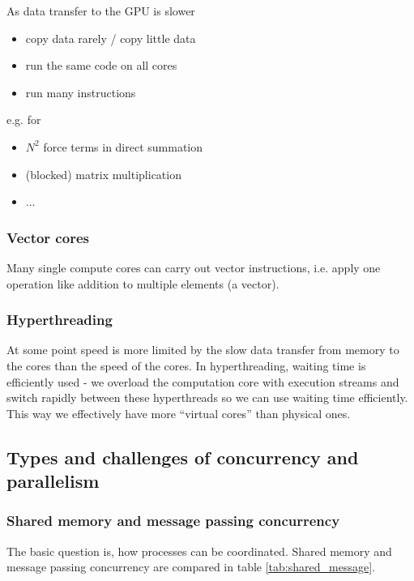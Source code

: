 As data transfer to the GPU is slower
\begin{itemize}
    \item copy data rarely / copy little data
    \item run the same code on all cores
    \item run many instructions
\end{itemize}
e.g. for
\begin{itemize}
    \item $N^2$ force terms in direct summation
    \item (blocked) matrix multiplication
    \item ...
\end{itemize}

\subsubsection{Vector cores}
Many single compute cores can carry out vector instructions, i.e. apply one operation
like addition to multiple elements (a vector).

\subsubsection{Hyperthreading}
At some point speed is more limited by the slow data transfer from memory 
to the cores than the speed of the cores. In hyperthreading, waiting time is 
efficiently used - we overload the computation core with execution streams and 
switch rapidly between these hyperthreads so we can use waiting time efficiently. 
This way we effectively have more “virtual cores” than physical ones.

\subsection{Types and challenges of concurrency and parallelism}
\subsubsection{Shared memory and message passing concurrency}
The basic question is, how processes can be coordinated.
Shared memory and message passing concurrency are compared in table \ref{tab:shared_message}.

